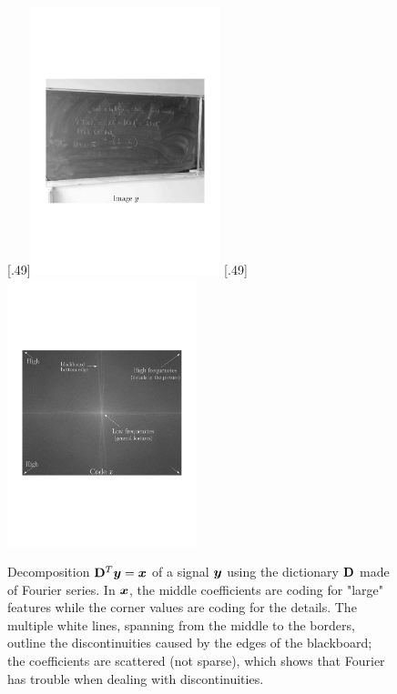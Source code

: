 \begin{figure}[!ht]
%
  [.49\linewidth]{\includegraphics[width=0.49\textwidth]{figures/exple_fourier_spacial.pdf}}
  [.49\linewidth]{\includegraphics[width=0.49\textwidth]{figures/exple_fourier_frequen.pdf}}
  \caption{Decomposition $\mathbf D^T\bm{y}=\bm x$ of a signal $\bm{y}$ using the dictionary $\mathbf D$ made of Fourier series. In $\bm x$, the middle coefficients are coding for "large" features while the corner values are coding for the details. The multiple white lines, spanning from the middle to the borders, outline the discontinuities caused by the edges of the blackboard; the coefficients are scattered (not sparse), which shows that Fourier has trouble when dealing with discontinuities.} \label{fig_fourier}
\end{figure}

